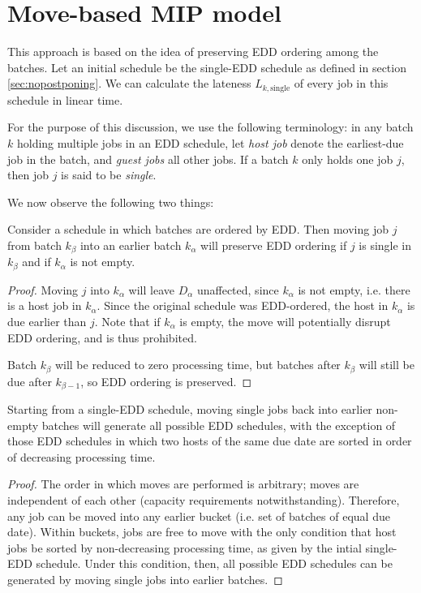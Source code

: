 \documentclass[13pt, letterpaper, oneside]{book}
\begin{document}
\section{Move-based MIP model}
This approach is based on the idea of preserving EDD ordering among the batches.
Let an initial schedule be the single-EDD schedule as defined in section
\ref{sec:nopostponing}. We can calculate the lateness
$L_{k,\text{single}}$ of every job in this schedule in linear time.

For the purpose of this discussion, we use the following terminology: in any
batch $k$ holding multiple jobs in an EDD schedule, let \textit{host job} denote
the earliest-due job in the batch, and \textit{guest jobs} all other jobs. If a
batch $k$ only holds one job $j$, then job $j$ is said to be \textit{single}.
 
We now observe the following two things:
 
\begin{proposition}
Consider a schedule in which batches are ordered by EDD. Then moving job $j$
from batch $k_\beta$ into an earlier batch $k_\alpha$ will preserve EDD ordering
if $j$ is single in $k_\beta$ and if $k_\alpha$ is not empty.
\end{proposition}
\begin{proof}
Moving $j$ into $k_\alpha$ will leave $D_\alpha$ unaffected, since $k_\alpha$ is
not empty, i.e. there is a host job in $k_\alpha$. Since the original schedule
was EDD-ordered, the host in $k_\alpha$ is due earlier than $j$. Note that if
$k_\alpha$ is empty, the move will potentially disrupt EDD ordering, and is thus
prohibited.
 
Batch $k_\beta$ will be reduced to zero processing time, but batches after
$k_\beta$ will still be due after $k_{\beta - 1}$, so EDD ordering is preserved.
\end{proof}
 
\begin{proposition}
Starting from a single-EDD schedule, moving single jobs back into earlier
non-empty batches will generate all possible EDD schedules, with the exception
of those EDD schedules in which two hosts of the same due date are sorted in
order of decreasing processing time.
\end{proposition}
\begin{proof}
The order in which moves are performed is arbitrary; moves are independent of
each other (capacity requirements notwithstanding). Therefore, any job can be
moved into any earlier bucket (i.e. set of batches of equal due date). Within
buckets, jobs are free to move with the only condition that host jobs be sorted
by non-decreasing processing time, as given by the intial single-EDD schedule.
Under this condition, then, all possible EDD schedules can be generated by
moving single jobs into earlier batches. \end{proof}
 
\end{document}
